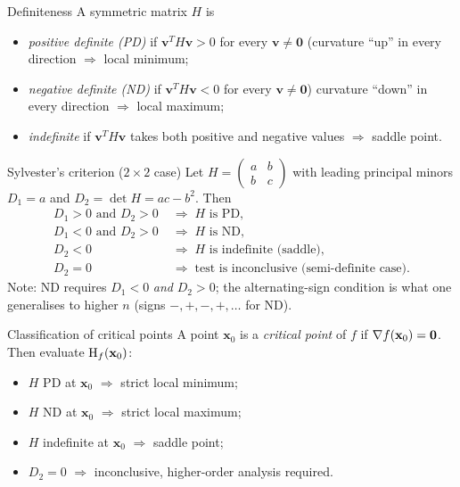 \begin{rulebox}{Definiteness}
A symmetric matrix $H$ is
\begin{itemize}[leftmargin=1.6em,itemsep=0.3ex]
  \item \emph{positive definite (PD)} if $\mathbf{v}^{T}H\mathbf{v}>0$ for
        every $\mathbf{v}\neq\mathbf{0}$ (curvature ``up'' in every
        direction $\Rightarrow$ local minimum;
  \item \emph{negative definite (ND)} if $\mathbf{v}^{T}H\mathbf{v}<0$ for
        every $\mathbf{v}\neq\mathbf{0}$) curvature ``down'' in every
        direction $\Rightarrow$ local maximum;
  \item \emph{indefinite} if $\mathbf{v}^{T}H\mathbf{v}$ takes both
        positive and negative values $\Rightarrow$ saddle point.
\end{itemize}
\end{rulebox}

\begin{rulebox}{Sylvester's criterion ($2\times2$ case)}
Let $H=\begin{pmatrix}a&b\\b&c\end{pmatrix}$ with leading principal minors
$D_1=a$ and $D_2=\det H=ac-b^{2}$. Then
\[
  \begin{aligned}
    D_1>0 \text{ and } D_2>0 &\;\Rightarrow\; H \text{ is PD}, \\
    D_1<0 \text{ and } D_2>0 &\;\Rightarrow\; H \text{ is ND}, \\
    D_2<0 &\;\Rightarrow\; H \text{ is indefinite (saddle)}, \\
    D_2=0 &\;\Rightarrow\; \text{test is inconclusive (semi-definite case)}.
  \end{aligned}
\]
Note: ND requires $D_1<0$ \emph{and} $D_2>0$; the alternating-sign
condition is what one generalises to higher $n$ (signs $-,+,-,+,\dots$ for
ND).
\end{rulebox}

\begin{rulebox}{Classification of critical points}
A point $\mathbf{x}_0$ is a \emph{critical point} of $f$ if
$\nabla f(\mathbf{x}_0)=\mathbf{0}$. Then evaluate $\operatorname{H}_f(\mathbf{x}_0)$:
\begin{itemize}[leftmargin=1.6em,itemsep=0.3ex]
  \item $H$ PD at $\mathbf{x}_0$ $\Rightarrow$ strict local minimum;
  \item $H$ ND at $\mathbf{x}_0$ $\Rightarrow$ strict local maximum;
  \item $H$ indefinite at $\mathbf{x}_0$ $\Rightarrow$ saddle point;
  \item $D_2=0$ $\Rightarrow$ inconclusive, higher-order analysis
        required.
\end{itemize}
\end{rulebox}

